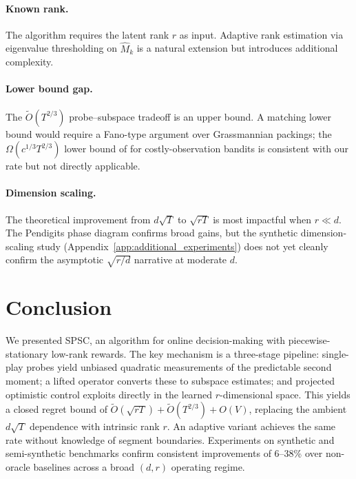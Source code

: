 \documentclass{article}
\begin{document}
\paragraph{Known rank.}
The algorithm requires the latent rank $r$ as input.
Adaptive rank estimation via eigenvalue thresholding on $\widehat{M}_k$ is a natural extension but introduces additional complexity.

\paragraph{Lower bound gap.}
The $\widetilde{O}(T^{2/3})$ probe--subspace tradeoff is an upper bound.
A matching lower bound would require a Fano-type argument over Grassmannian packings; the $\Omega(c^{1/3}T^{2/3})$ lower bound of \citet{tucker2023costly} for costly-observation bandits is consistent with our rate but not directly applicable.

\paragraph{Dimension scaling.}
The theoretical improvement from $d\sqrt{T}$ to $\sqrt{rT}$ is most impactful when $r \ll d$.
The Pendigits phase diagram confirms broad gains, but the synthetic dimension-scaling study (Appendix~\ref{app:additional_experiments}) does not yet cleanly confirm the asymptotic $\sqrt{r/d}$ narrative at moderate $d$.

\section{Conclusion}
\label{sec:conclusion}

We presented SPSC, an algorithm for online decision-making with piecewise-stationary low-rank rewards.
The key mechanism is a three-stage pipeline: single-play probes yield unbiased quadratic measurements of the predictable second moment; a lifted operator converts these to subspace estimates; and projected optimistic control exploits directly in the learned $r$-dimensional space.
This yields a closed regret bound of $\widetilde{O}(\sqrt{rT}) + \widetilde{O}(T^{2/3}) + O(V)$, replacing the ambient $d\sqrt{T}$ dependence with intrinsic rank $r$.
An adaptive variant achieves the same rate without knowledge of segment boundaries.
Experiments on synthetic and semi-synthetic benchmarks confirm consistent improvements of 6--38\% over non-oracle baselines across a broad $(d,r)$ operating regime.
\end{document}
